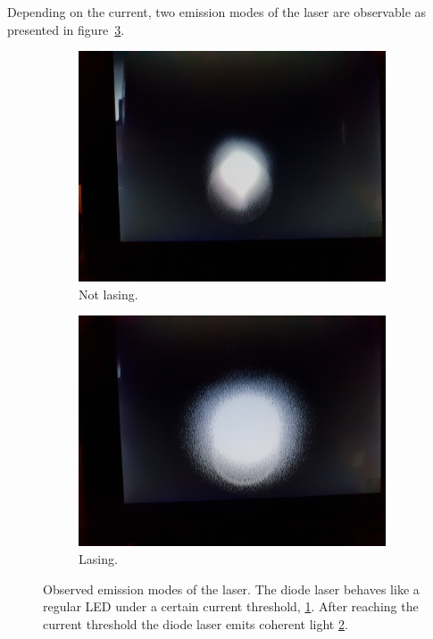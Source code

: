Depending on the current, two emission modes of the laser are observable as presented in
figure~\ref{fig: emission_modes}.
\begin{figure}
  \centering
      \begin{subfigure}{0.48\textwidth}
          \centering
          \includegraphics[width = \textwidth]{./content/images/diodelaser_not_lasering.jpg}
          \caption{Not lasing.}
          \label{fig:not_lasering}
      \end{subfigure}
      \begin{subfigure}{0.48\textwidth}
          \centering
          \includegraphics[width = \textwidth]{./content/images/diodelaser_lasering.jpg}
          \caption{Lasing.}
          \label{fig:lasering}
      \end{subfigure}
  \caption{Observed emission modes of the laser. The diode laser behaves like a regular
  LED under a certain current threshold, \ref{fig:not_lasering}. After reaching the
  current threshold the diode laser emits coherent light \ref{fig:lasering}. }
\label{fig: emission_modes}
\end{figure}
